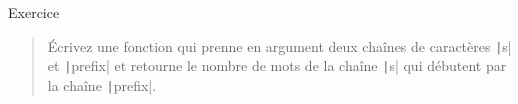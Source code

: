 \documentclass[10pt]{beamer}
\begin{document}
\begin{frame}{Exercice}
  \begin{quote}
    Écrivez une fonction qui prenne en argument deux chaînes de caractères \texttt|s| et \texttt|prefix| et retourne le nombre de mots de la chaîne \texttt|s| qui débutent par la chaîne \texttt|prefix|.
  \end{quote}
\end{frame}
\end{document}
